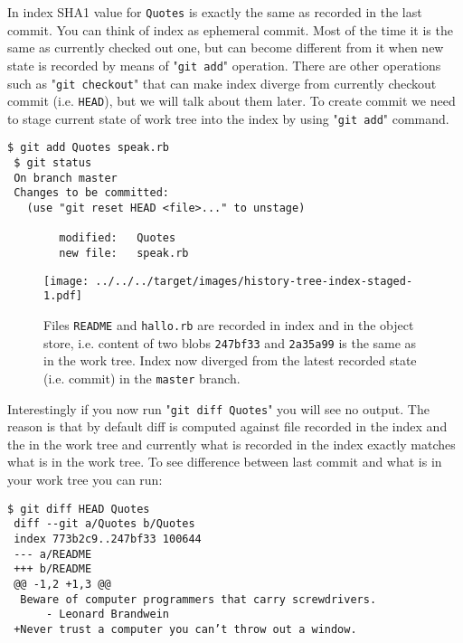 \documentclass{article}
\theoremstyle{definition}
\begin{document}
        \noindent In index SHA1 value for \texttt{Quotes} is exactly the same as recorded in the last commit. You can
        think of index as ephemeral commit. Most of the time it is the same as currently checked out one, but can
        become different from it when new state is recorded by means of "\texttt{git add}" operation. There are other
        operations such as "\texttt{git checkout}" that can make index diverge from currently checkout commit
        (i.e. \texttt{HEAD}), but we will talk about them later. To create commit we need to stage current state of work
        tree into the index by using "\texttt{git add}" command.

    \begin{Verbatim}[frame=single]
 $ git add Quotes speak.rb
 $ git status
 On branch master
 Changes to be committed:
   (use "git reset HEAD <file>..." to unstage)

        modified:   Quotes
        new file:   speak.rb
        \end{Verbatim}

        \begin{figure}[h]
        \centering\texttt{[image: ../../../target/images/history-tree-index-staged-1.pdf]}
        \caption{Files \texttt{README} and \texttt{hallo.rb} are recorded in index and in the object store, i.e.
          content of two blobs \texttt{247bf33} and \texttt{2a35a99} is the same as in the work tree. Index now
          diverged from the latest recorded state (i.e. commit) in the \texttt{master} branch.
          \label{fig:history-tree-index-staged-1}}
        \end{figure}

        \noindent Interestingly if you now run "\texttt{git diff Quotes}" you will see no output. The reason is that by
        default diff is computed against file recorded in the index and the in the work tree and currently what is
        recorded in the index exactly matches what is in the work tree. To see difference between last commit and what
        is in your work tree you can run:

    \begin{Verbatim}[frame=single]
 $ git diff HEAD Quotes
 diff --git a/Quotes b/Quotes
 index 773b2c9..247bf33 100644
 --- a/README
 +++ b/README
 @@ -1,2 +1,3 @@
  Beware of computer programmers that carry screwdrivers.
      - Leonard Brandwein
 +Never trust a computer you can’t throw out a window.
        \end{Verbatim}
\end{document}

